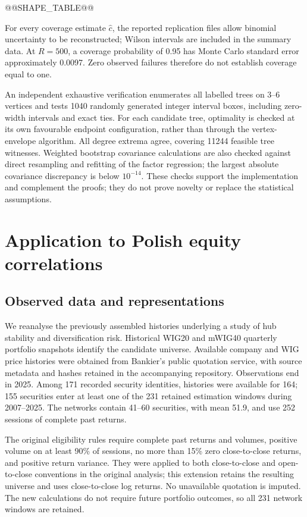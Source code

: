 \documentclass[pdflatex,sn-mathphys-ay]{sn-jnl}
\theoremstyle{thmstyleone}
\theoremstyle{thmstyletwo}
\begin{document}
@@SHAPE_TABLE@@

For every coverage estimate $\widehat c$, the reported replication files allow binomial uncertainty to be reconstructed; Wilson intervals are included in the summary data. At $R=500$, a coverage probability of 0.95 has Monte Carlo standard error approximately 0.0097. Zero observed failures therefore do not establish coverage equal to one.

An independent exhaustive verification enumerates all labelled trees on 3--6 vertices and tests 1040 randomly generated integer interval boxes, including zero-width intervals and exact ties. For each candidate tree, optimality is checked at its own favourable endpoint configuration, rather than through the vertex-envelope algorithm. All degree extrema agree, covering 11244 feasible tree witnesses. Weighted bootstrap covariance calculations are also checked against direct resampling and refitting of the factor regression; the largest absolute covariance discrepancy is below $10^{-14}$. These checks support the implementation and complement the proofs; they do not prove novelty or replace the statistical assumptions.

\section{Application to Polish equity correlations}\label{sec:gpw}
\subsection{Observed data and representations}
We reanalyse the previously assembled histories underlying a study of hub stability and diversification risk. Historical WIG20 and mWIG40 quarterly portfolio snapshots identify the candidate universe. Available company and WIG price histories were obtained from Bankier's public quotation service, with source metadata and hashes retained in the accompanying repository. Observations end in 2025. Among 171 recorded security identities, histories were available for 164; 155 securities enter at least one of the 231 retained estimation windows during 2007--2025. The networks contain 41--60 securities, with mean 51.9, and use 252 sessions of complete past returns.

The original eligibility rules require complete past returns and volumes, positive volume on at least 90\% of sessions, no more than 15\% zero close-to-close returns, and positive return variance. They were applied to both close-to-close and open-to-close conventions in the original analysis; this extension retains the resulting universe and uses close-to-close log returns. No unavailable quotation is imputed. The new calculations do not require future portfolio outcomes, so all 231 network windows are retained.
\end{document}
